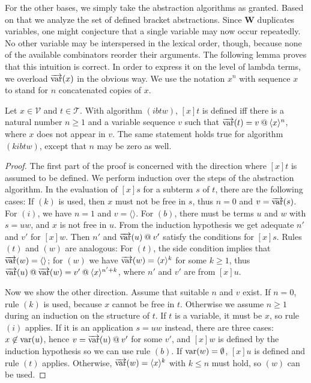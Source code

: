 For the other bases, we simply take the abstraction algorithms as granted.
Based on that we analyze the set of defined bracket abstractions.
Since $\mathbf{W}$ duplicates variables, one might conjecture that a single
variable may now occur repeatedly.
No other variable may be interspersed in the lexical order, though, because
none of the available combinators reorder their arguments.
The following lemma proves that this intuition is correct.
In order to express it on the level of lambda terms, we overload $\overrightarrow{\operatorname{var}}(x)$
in the obvious way.
We use the notation $x^n$ with sequence $x$ to stand for $n$ concatenated
copies of $x$.

\begin{lemma}
Let $x \in \mathcal{V}$ and $t \in \mathcal{T}$.
With algorithm $(ibtw)$, $[x]t$ is defined iff there is a natural number
$n \geq 1$ and a variable sequence $v$ such that
$\overrightarrow{\operatorname{var}}(t) = v \mathbin{@} \langle x \rangle^n$, where $x$ does not appear in $v$.
The same statement holds true for algorithm $(kibtw)$, except that $n$ may be
zero as well.
\end{lemma}
\begin{proof}
The first part of the proof is concerned with the direction where $[x]t$ is
assumed to be defined.
We perform induction over the steps of the abstraction algorithm.
In the evaluation of $[x]s$ for a subterm $s$ of $t$, there are the following
cases:
If $(k)$ is used, then $x$ must not be free in $s$, thus $n = 0$ and $v = \overrightarrow{\operatorname{var}}(s)$.
For $(i)$, we have $n = 1$ and $v = \langle\rangle$.
For $(b)$, there must be terms $u$ and $w$ with $s = uw$, and $x$ is not free
in $u$.
From the induction hypothesis we get adequate $n'$ and $v'$ for $[x]w$.
Then $n'$ and $\overrightarrow{\operatorname{var}}(u) \mathbin{@} v'$ satisfy the conditions for $[x]s$.
Rules $(t)$ and $(w)$ are analogous:
For $(t)$, the side condition implies that $\overrightarrow{\operatorname{var}}(w) = \langle\rangle$;
for $(w)$ we have $\overrightarrow{\operatorname{var}}(w) = \langle x \rangle^k$ for some $k \geq 1$,
thus $\overrightarrow{\operatorname{var}}(u) \mathbin{@} \overrightarrow{\operatorname{var}}(w) = v' \mathbin{@} \langle x \rangle^{n'+k}$,
where $n'$ and $v'$ are from $[x]u$.

Now we show the other direction.
Assume that suitable $n$ and $v$ exist.
If $n = 0$, rule $(k)$ is used, because $x$ cannot be free in $t$.
Otherwise we assume $n \geq 1$ during an induction on the structure of $t$.
If $t$ is a variable, it must be $x$, so rule $(i)$ applies.
If it is an application $s = uw$ instead, there are three cases:
$x \not\in \operatorname{var}(u)$, hence $v = \overrightarrow{\operatorname{var}}(u) \mathbin{@} v'$ for some $v'$,
and $[x]w$ is defined by the induction hypothesis so we can use rule $(b)$.
If $\operatorname{var}(w) = \emptyset$, $[x]u$ is defined and rule $(t)$ applies.
Otherwise, $\overrightarrow{\operatorname{var}}(w) = \langle x \rangle^k$ with $k \leq n$ must hold,
so $(w)$ can be used.
\end{proof}

